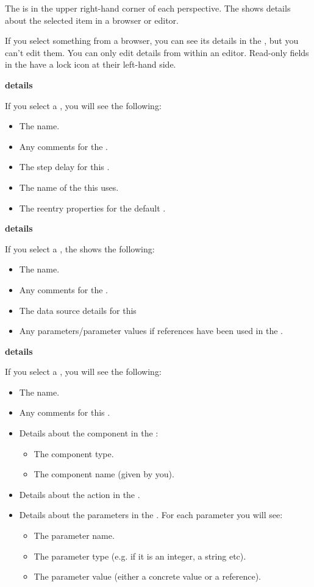 The \gdpropview{} is in the upper right-hand corner of each perspective. The \gdpropview{} shows details about the selected item in a browser or editor. 

If you select something from a browser, you can see its details in the \gdpropview{}, but you can't edit them. You can only edit details from within an editor. Read-only fields in the \gdpropview{} have a lock icon at their left-hand side. 

\textbf{\gdsuite{} details}

If you select a \gdsuite{}, you will see the following:
\begin{itemize}
\item The \gdsuite{} name.
\item Any comments for the \gdsuite{}. 
\item The step delay for this \gdsuite{}.
\item The name of the \gdaut{} this \gdsuite{} uses. 
\item The reentry properties for the default \gdehandlers{}. 
\end{itemize}

\textbf{\gdcase{} details}

If you select a \gdcase{}, the \gdpropview{} shows the following:

\begin{itemize}
\item The \gdcase{} name.
\item Any comments for the \gdcase{}. 
\item The data source details for this \gdcase{}
\item Any parameters/parameter values if references have been used in the \gdcase{}. 
\end{itemize}


\textbf{\gdstep{} details}

If you select a \gdstep{}, you will see the following:
\begin{itemize}
\item The \gdstep{} name.
\item Any comments for this \gdstep{}. 
\item Details about the component in the \gdstep{}:
\begin{itemize}
\item  The component type.
\item  The component name (given by you).
\end{itemize}
\item Details about the action in the \gdstep{}.
\item Details about the parameters in the \gdstep{}. For each parameter you will see:
\begin{itemize}
\item The parameter name.
\item The parameter type (e.g. if it is an integer, a string etc).
\item The parameter value (either a concrete value or a reference). 
\end{itemize}
\end{itemize}

